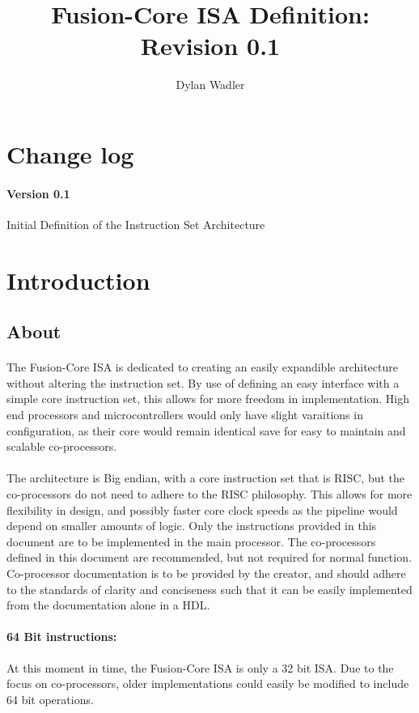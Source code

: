 \documentclass[letterpaper, 11pt]{article}
\title{Fusion-Core ISA Definition: Revision 0.1}
\author{Dylan Wadler}
\begin{document}
\maketitle
\newpage
\tableofcontents


\newpage
\section{Change log}
\paragraph{Version 0.1} Initial Definition of the Instruction Set Architecture

\section{Introduction}

\subsection{About}
\paragraph{}The Fusion-Core ISA is dedicated to creating an easily expandible architecture without altering
the instruction set. By use of defining an easy interface with a simple core instruction set, this allows for
more freedom in implementation. High end processors and microcontrollers would only have slight varaitions in
configuration, as their core would remain identical save for easy to maintain and scalable co-processors.
\paragraph{}The architecture is Big endian, with a core instruction set that is RISC, but the co-processors do not need to adhere to the RISC philosophy. This allows for more flexibility in design, and possibly faster core clock speeds as the pipeline would depend on smaller amounts of logic. Only the instructions provided in this document are to be implemented in the main processor. The co-processors defined in this document are recommended, but not required for normal function. Co-processor documentation is to be provided by the creator, and should adhere to the standards of clarity and conciseness such that it can be easily implemented from the documentation alone in a HDL. 
\paragraph{64 Bit instructions:}At this moment in time, the Fusion-Core ISA is only a 32 bit ISA. Due to the focus on co-processors,
older implementations could easily be modified to include 64 bit operations.
\end{document}
